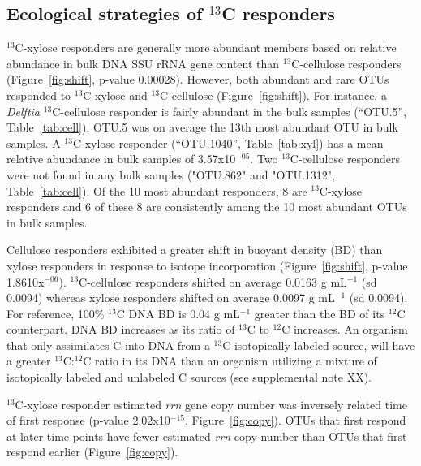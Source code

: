 \subsection{Ecological strategies of $^{13}$C responders}
$^{13}$C-xylose responders are generally more abundant members based on
relative abundance in bulk DNA SSU rRNA gene content than $^{13}$C-cellulose
responders (Figure~\ref{fig:shift}, p-value 0.00028).  However, both abundant
and rare OTUs responded to $^{13}$C-xylose and $^{13}$C-cellulose
(Figure~\ref{fig:shift}). For instance, a \textit{Delftia} $^{13}$C-cellulose
responder is fairly abundant in the bulk samples (``OTU.5'',
Table~\ref{tab:cell}). OTU.5 was on average the 13th most abundant OTU in bulk
samples. A $^{13}$C-xylose responder (``OTU.1040'', Table~\ref{tab:xyl}) has a
mean relative abundance in bulk samples of 3.57x10$^{-05}$. Two
$^{13}$C-cellulose responders were not found in any bulk samples ("OTU.862" and
"OTU.1312", Table~\ref{tab:cell}). Of the 10 most abundant responders, 8 are
$^{13}$C-xylose responders and 6 of these 8 are consistently among the 10 most
abundant OTUs in bulk samples.

Cellulose responders exhibited a greater shift in buoyant density (BD) than
xylose responders in response to isotope incorporation (Figure~\ref{fig:shift},
p-value 1.8610x$^{-06}$). $^{13}$C-cellulose responders shifted on average
0.0163 g mL$^{-1}$ (sd 0.0094) whereas xylose responders shifted on average
0.0097 g mL$^{-1}$ (sd 0.0094). For reference, 100\% $^{13}$C DNA BD is 0.04
g mL$^{-1}$ greater than the BD of its $^{12}$C counterpart. DNA BD increases
as its ratio of $^{13}$C to $^{12}$C increases. An organism that only
assimilates C into DNA from a $^{13}$C isotopically labeled source, will have
a greater $^{13}$C:$^{12}$C ratio in its DNA than an organism utilizing
a mixture of isotopically labeled and unlabeled C sources (see supplemental
note XX). 

$^{13}$C-xylose responder estimated \textit{rrn} gene copy number was
inversely related time of first response (p-value 2.02x10$^{-15}$,
Figure~\ref{fig:copy}). OTUs that first respond at later time points have
fewer estimated \textit{rrn} copy number than OTUs that first respond
earlier (Figure~\ref{fig:copy}). 





